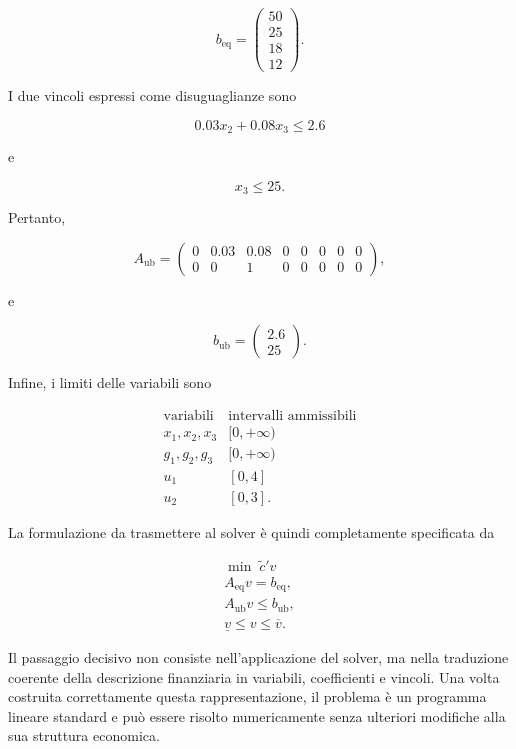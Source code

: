\begin{enumerate}
\[
b_{\mathrm{eq}}
=
\begin{pmatrix}
50\\
25\\
18\\
12
\end{pmatrix}.
\]

I due vincoli espressi come disuguaglianze sono

\[
0.03x_2+0.08x_3\leq2.6
\]

e

\[
x_3\leq25.
\]

Pertanto,

\[
A_{\mathrm{ub}}
=
\begin{pmatrix}
0 & 0.03 & 0.08 & 0 & 0 & 0 & 0 & 0\\
0 & 0    & 1    & 0 & 0 & 0 & 0 & 0
\end{pmatrix},
\]

e

\[
b_{\mathrm{ub}}
=
\begin{pmatrix}
2.6\\
25
\end{pmatrix}.
\]

Infine, i limiti delle variabili sono

\[
\begin{array}{c|c}
\text{variabili} & \text{intervalli ammissibili}\\
\hline
x_1,x_2,x_3 & [0,+\infty)\\
g_1,g_2,g_3 & [0,+\infty)\\
u_1 & [0,4]\\
u_2 & [0,3].
\end{array}
\]

La formulazione da trasmettere al solver \`e quindi completamente
specificata da

\[
\boxed{
\begin{array}{c}
\displaystyle
\min\;\widetilde c'v
\\[6pt]
A_{\mathrm{eq}}v=b_{\mathrm{eq}},
\\[4pt]
A_{\mathrm{ub}}v\leq b_{\mathrm{ub}},
\\[4pt]
\underline v\leq v\leq\overline v.
\end{array}
}
\]

Il passaggio decisivo non consiste nell'applicazione del solver, ma nella
traduzione coerente della descrizione finanziaria in variabili, coefficienti
e vincoli. Una volta costruita correttamente questa rappresentazione, il
problema \`e un programma lineare standard e pu\`o essere risolto
numericamente senza ulteriori modifiche alla sua struttura economica.

\end{enumerate}


